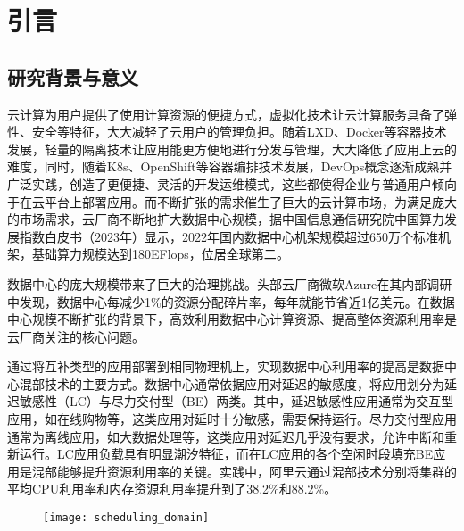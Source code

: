 \chapter{引言}\label{chap:introduction}

\section{研究背景与意义}


云计算为用户提供了使用计算资源的便捷方式，虚拟化技术让云计算服务具备了弹性、安全等特征，大大减轻了云用户的管理负担。随着LXD、Docker等容器技术发展，轻量的隔离技术让应用能更方便地进行分发与管理，大大降低了应用上云的难度，同时，随着K8s、OpenShift等容器编排技术发展，DevOps概念逐渐成熟并广泛实践，创造了更便捷、灵活的开发运维模式，这些都使得企业与普通用户倾向于在云平台上部署应用。而不断扩张的需求催生了巨大的云计算市场，为满足庞大的市场需求，云厂商不断地扩大数据中心规模，据中国信息通信研究院中国算力发展指数白皮书（2023年）显示，2022年国内数据中心机架规模超过650万个标准机架，基础算力规模达到180EFlops，位居全球第二\citep{chinaict2023}。

数据中心的庞大规模带来了巨大的治理挑战。头部云厂商微软Azure在其内部调研中发现，数据中心每减少1\%的资源分配碎片率，每年就能节省近1亿美元\citep{hadary2020protean}。在数据中心规模不断扩张的背景下，高效利用数据中心计算资源、提高整体资源利用率是云厂商关注的核心问题。

通过将互补类型的应用部署到相同物理机上，实现数据中心利用率的提高是数据中心混部技术的主要方式。数据中心通常依据应用对延迟的敏感度，将应用划分为延迟敏感性（LC）与尽力交付型（BE）两类。其中，延迟敏感性应用通常为交互型应用，如在线购物等，这类应用对延时十分敏感，需要保持运行。尽力交付型应用通常为离线应用，如大数据处理等，这类应用对延迟几乎没有要求，允许中断和重新运行。LC应用负载具有明显潮汐特征，而在LC应用的各个空闲时段填充BE应用是混部能够提升资源利用率的关键。实践中，阿里云通过混部技术分别将集群的平均CPU利用率和内存资源利用率提升到了38.2\%和88.2\%\citep{guo2019limits}。

\begin{figure}[!htbp]
    \centering
    \texttt{[image: scheduling\_domain]}
    \label{fig:scheduling_domain}
\end{figure}

